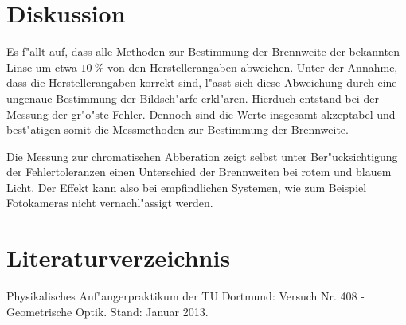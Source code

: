 \clearpage
\section{Diskussion}
	\label{sec:diskussion}
	Es f"allt auf, dass alle Methoden zur Bestimmung der Brennweite der bekannten Linse um etwa $\SI{10}{\percent}$ von den Herstellerangaben abweichen.
	Unter der Annahme, dass die Herstellerangaben korrekt sind, l"asst sich diese Abweichung durch eine ungenaue Bestimmung der Bildsch"arfe erkl"aren.
	Hierduch entstand bei der Messung der gr"o"ste Fehler.
	Dennoch sind die Werte insgesamt akzeptabel und best"atigen somit die Messmethoden zur Bestimmung der Brennweite.

	Die Messung zur chromatischen Abberation zeigt selbst unter Ber"ucksichtigung der Fehlertoleranzen einen Unterschied der Brennweiten bei rotem und blauem Licht.
	Der Effekt kann also bei empfindlichen Systemen, wie zum Beispiel Fotokameras nicht vernachl"assigt werden.


\section{Literaturverzeichnis}
	\label{sec:literaturverzeichnis}

	\begin{thebibliography}{9}
		 Physikalisches Anf"angerpraktikum der TU Dortmund: Versuch Nr. 408 - Geometrische Optik. Stand: Januar 2013.
	\end{thebibliography}
